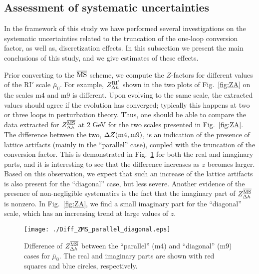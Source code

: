 \documentclass[12pt,tighten,nofootinbib,amssymb,floatfix]{article}
\newcommand{\MSb}{{\overline{\rm MS}}}
\begin{document}
\subsection{Assessment of systematic uncertainties}
\label{sub3.2}
\medskip

In the framework of this study we have performed several investigations on the systematic uncertainties 
related to the truncation of the one-loop conversion factor, as well as, discretization effects. In this subsection
we present the main conclusions of this study, and we give estimates of these effects.

\vspace*{0.3cm}
Prior converting to the $\MSb$ scheme, we compute the $Z$-factors for different values of the RI$'$ scale $\bar\mu_0$. 
For example, $Z_{\Delta h}^{\rm RI'}$ shown in the two plots of Fig.~\ref{fig:ZA} on the scales m4 and m9 is different. 
Upon evolving to the same scale, the extracted values should agree if the evolution has converged; typically this happens 
at two or three loops in perturbation theory. Thus, one should be able to compare the data extracted for 
$Z_{\Delta h}^\MSb$ at 2 GeV for the two scales presented in Fig.~\ref{fig:ZA}. The difference between the two, $\Delta Z({\rm m4, m9})$, 
is an indication of the presence of lattice artifacts (mainly in the ``parallel'' case), coupled with the truncation of the conversion factor. 
This is demonstrated in Fig.~\ref{fig:ZAdiff} for both the real and imaginary parts, and it is interesting to see that the difference 
increases as $z$ becomes larger. Based on this observation, we expect that such an increase of the lattice artifacts is also present 
for the ``diagonal'' case, but less severe. Another evidence of the presence of non-negligible systematics is the fact that the imaginary 
part of $Z_{\Delta h}^\MSb$ is nonzero. In Fig.~\ref{fig:ZA}, we find a small imaginary part for the ``diagonal'' scale, which has an 
increasing trend at large values of $z$.

\vspace*{0.3cm}
\begin{figure}[h!]
\centering
\texttt{[image: ./Diff\_ZMS\_parallel\_diagonal.eps]}
\vspace*{-0.3cm}
\begin{minipage}{15cm}
\hspace*{3cm}
\caption{\small{Difference of $Z_{\Delta h}^\MSb$ between the ``parallel'' (m4) and ``diagonal'' (m9) cases for $\bar\mu_0$. 
The real and imaginary parts are shown with red squares and blue circles, respectively.}}
\label{fig:ZAdiff}
\end{minipage}
\end{figure}
\end{document}
